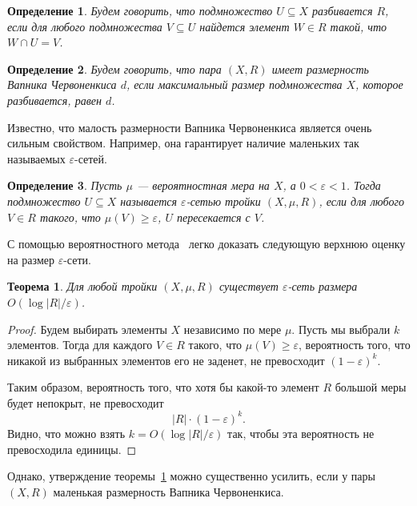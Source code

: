 \documentclass[12pt]{article}
\DeclareRobustCommand*{\CC}{\,\textendash\,\hskip 0pt}
\newtheorem{definition}{Определение}
\newtheorem{theorem}{Теорема}
\begin{document}
    \begin{definition}
        Будем говорить, что подмножество $U \subseteq X$ \emph{разбивается} $R$, если
        для любого подмножества $V \subseteq U$ найдется элемент $W \in R$ такой,
        что $W \cap U = V$.
    \end{definition}
    \begin{definition}
        Будем говорить, что пара $(X, R)$ имеет размерность Вапника\CC Червоненкиса $d$, если максимальный размер 
        подмножества $X$, которое разбивается, равен $d$.
    \end{definition}

    Известно, что малость размерности Вапника\CC Червоненкиса является очень сильным свойством. Например, она гарантирует
    наличие маленьких так называемых $\varepsilon$-сетей.

    \begin{definition}
        Пусть $\mu$ --- вероятностная мера на $X$, а $0 < \varepsilon < 1$.
        Тогда подмножество $U \subseteq X$
        называется \emph{$\varepsilon$-сетью} тройки $(X, \mu, R)$, если для любого
        $V \in R$ такого, что $\mu(V) \geq \varepsilon$, $U$ пересекается с $V$.
    \end{definition}

    С помощью вероятностного метода~\cite{AS92} легко доказать следующую верхнюю оценку на размер
    $\varepsilon$-сети.

    \begin{theorem}
        \label{naive_epsilon_net}
        Для любой тройки $(X, \mu, R)$ существует $\varepsilon$-сеть размера
        $O(\log |R| / \varepsilon)$.
    \end{theorem}
    \begin{proof}
        Будем выбирать элементы $X$ независимо по мере $\mu$.
        Пусть мы выбрали $k$ элементов. Тогда для каждого $V \in R$ такого, что
        $\mu(V) \geq \varepsilon$, вероятность того, что никакой из выбранных элементов
        его не заденет, не превосходит $(1 - \varepsilon)^k$.

        Таким образом, вероятность того, что хотя бы какой-то элемент $R$ большой меры будет
        непокрыт, не превосходит
        $$
            |R| \cdot (1 - \varepsilon)^k.
        $$
        Видно, что можно взять $k = O(\log |R| / \varepsilon)$ так, чтобы эта вероятность не превосходила
        единицы.
    \end{proof}

    Однако, утверждение теоремы~\ref{naive_epsilon_net} можно существенно усилить, если у пары $(X, R)$
    маленькая размерность Вапника\CC Червоненкиса.
\end{document}
